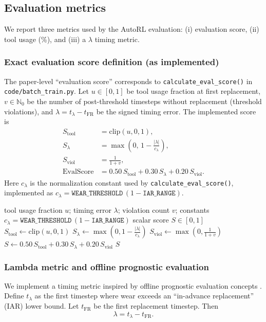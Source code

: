 \documentclass[refree,sn-basic]{sn-jnl} %
\begin{document}
\subsection{Evaluation metrics}
\label{sec:metrics}
We report three metrics used by the AutoRL evaluation: (i) evaluation score, (ii) tool usage (\%), and (iii) a $\lambda$ timing metric.

\subsubsection{Exact evaluation score definition (as implemented)}
The paper-level ``evaluation score'' corresponds to \texttt{calculate\_eval\_score()} in \texttt{code/batch\_train.py}. Let $u\in[0,1]$ be tool usage fraction at first replacement, $v\in\mathbb{N}_0$ be the number of post-threshold timesteps without replacement (threshold violations), and $\lambda=t_{\lambda}-t_{\mathrm{FR}}$ be the signed timing error. The implemented score is
\begin{align}
S_{\text{tool}} &= \mathrm{clip}(u,0,1),\\
S_{\lambda} &= \max\left(0,\,1-\frac{|\lambda|}{c_{\lambda}}\right),\\
S_{\text{viol}} &= \frac{1}{1+v},\\
\mathrm{EvalScore} &= 0.50\,S_{\text{tool}} + 0.30\,S_{\lambda} + 0.20\,S_{\text{viol}}.
\end{align}
Here $c_{\lambda}$ is the normalization constant used by \texttt{calculate\_eval\_score()}, implemented as $c_{\lambda}=\texttt{WEAR\_THRESHOLD}\,(1-\texttt{IAR\_RANGE})$.

\begin{algorithm}[t]
\caption{Evaluation score computation (per evaluation run)}
\label{alg:eval_score}
\begin{algorithmic}[1]
\Require tool usage fraction $u$; timing error $\lambda$; violation count $v$; constants $c_{\lambda}=\texttt{WEAR\_THRESHOLD}\,(1-\texttt{IAR\_RANGE})$
\Ensure scalar score $S\in[0,1]$
\State $S_{\mathrm{tool}} \gets \mathrm{clip}(u, 0, 1)$
\State $S_{\lambda} \gets \max\left(0, 1 - \frac{|\lambda|}{c_{\lambda}}\right)$
\State $S_{\mathrm{viol}} \gets \max\left(0, \frac{1}{1+v}\right)$
\State $S \gets 0.50\,S_{\mathrm{tool}} + 0.30\,S_{\lambda} + 0.20\,S_{\mathrm{viol}}$
\State \Return $S$
\end{algorithmic}
\end{algorithm}

\subsubsection{Lambda metric and offline prognostic evaluation}
We implement a timing metric inspired by offline prognostic evaluation concepts \cite{Saxena2008Metrics}. Define $t_{\lambda}$ as the first timestep where wear exceeds an ``in-advance replacement'' (IAR) lower bound. Let $t_{\mathrm{FR}}$ be the first replacement timestep. Then
\begin{equation}
        \lambda = t_{\lambda} - t_{\mathrm{FR}}.
\end{equation}
\end{document}
